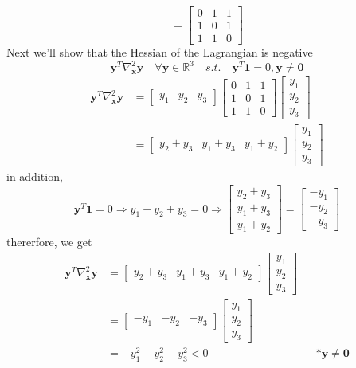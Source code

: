 \documentclass{article}
\begin{document}
\begin{enumerate}[(a)]
\[ = 
 \begin{bmatrix} 
 0& 1 & 1 \\
  1& 0 & 1 \\
   1& 1 & 0 
 \end{bmatrix}
 \]
Next we'll show that the Hessian of the Lagrangian is negative
\[\mathbf{y}^T\nabla_{\mathbf{x}}^2\mathbf{y} \quad \forall \mathbf{y}\in \mathbb{R}^3 \quad s.t. \quad \mathbf{y}^T\mathbf{1} = 0 , \mathbf{y}\ne \mathbf{0} \]
\begin{align*}
\mathbf{y}^T\nabla_{\mathbf{x}}^2\mathbf{y} &= 
 \begin{bmatrix} 
 y_1& y_2 & y_3 
 \end{bmatrix}
 \begin{bmatrix} 
  0& 1 & 1 \\
   1& 0 & 1 \\
    1& 1 & 0 
  \end{bmatrix}
   \begin{bmatrix} 
   y_1\\ y_2 \\ y_3 
   \end{bmatrix} \\ 
   &=
\begin{bmatrix} 
 y_2+y_3& y_1+y_3 & y_1+y_2 
 \end{bmatrix}
\begin{bmatrix} 
   y_1\\ y_2 \\ y_3 
   \end{bmatrix} 
\end{align*}
in addition,
\[\mathbf{y}^T\mathbf{1} = 0 \Rightarrow y_1+y_2+y_3 = 0 \Rightarrow 
\begin{bmatrix} 
 y_2+y_3\\ y_1+y_3 \\ y_1+y_2 
 \end{bmatrix}
 =
 \begin{bmatrix} 
    -y_1\\ -y_2 \\ -y_3 
    \end{bmatrix} 
\]
thererfore, we get
\begin{align*}
\mathbf{y}^T\nabla_{\mathbf{x}}^2\mathbf{y} 
&=
\begin{bmatrix} 
 y_2+y_3& y_1+y_3 & y_1+y_2 
 \end{bmatrix}
\begin{bmatrix} 
   y_1\\ y_2 \\ y_3 
   \end{bmatrix} \\
&= 
\begin{bmatrix} 
 -y_1& -y_2 & -y_3 
 \end{bmatrix}
\begin{bmatrix} 
   y_1\\ y_2 \\ y_3 
   \end{bmatrix} \\
   &= -y_1^2 -y_2^2 -y_3^2 < 0 && *\mathbf{y}\ne \mathbf{0}
\end{align*}
\end{enumerate}
\end{document}

